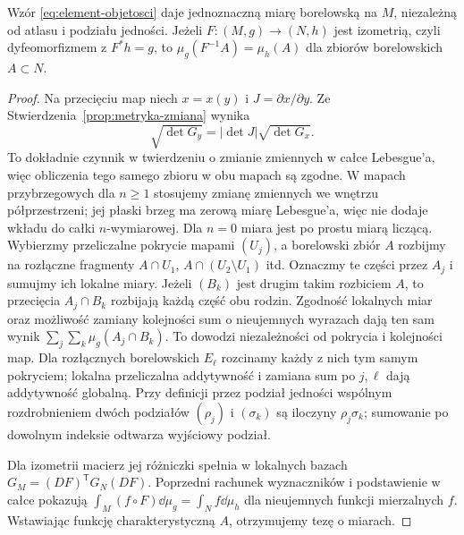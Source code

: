 \begin{twierdzenie}
\label{thm:element-objetosci-globalny}
Wzór \eqref{eq:element-objetosci} daje
jednoznaczną miarę borelowską na $M$, niezależną od atlasu
i podziału jedności. Jeżeli $F:(M,g)\to(N,h)$
jest izometrią, czyli dyfeomorfizmem z $F^*h=g$,
to $\mu_g(F^{-1}A)=\mu_h(A)$ dla zbiorów
borelowskich $A\subset N$.
\end{twierdzenie}
\begin{proof}
Na przecięciu map niech $x=x(y)$ i
$J=\partial x/\partial y$. Ze
Stwierdzenia~\ref{prop:metryka-zmiana} wynika
\[
 \sqrt{\det G_y}
   =|\det J|\sqrt{\det G_x}.
\]
To dokładnie czynnik w twierdzeniu o zmianie
zmiennych w całce Lebesgue'a, więc obliczenia
tego samego zbioru w obu mapach są zgodne.
W mapach przybrzegowych dla $n\geq1$ stosujemy
zmianę zmiennych we wnętrzu półprzestrzeni;
jej płaski brzeg ma zerową miarę Lebesgue'a,
więc nie dodaje wkładu do całki $n$-wymiarowej.
Dla $n=0$ miara jest po prostu miarą liczącą.
Wybierzmy przeliczalne pokrycie mapami
$(U_j)$, a borelowski zbiór $A$ rozbijmy
na rozłączne fragmenty
$A\cap U_1$,
$A\cap(U_2\setminus U_1)$ itd.
Oznaczmy te części przez $A_j$ i sumujmy ich lokalne miary.
Jeżeli $(B_k)$ jest drugim takim rozbiciem $A$,
to przecięcia $A_j\cap B_k$ rozbijają każdą część
obu rodzin. Zgodność lokalnych miar oraz możliwość
zamiany kolejności sum o nieujemnych wyrazach
dają ten sam wynik $\sum_j\sum_k\mu_g(A_j\cap B_k)$.
To dowodzi niezależności od pokrycia i kolejności map.
Dla rozłącznych borelowskich $E_\ell$ rozcinamy
każdy z nich tym samym pokryciem; lokalna przeliczalna
addytywność i zamiana sum po $j,\ell$ dają
addytywność globalną. Przy definicji przez podział jedności
wspólnym rozdrobnieniem dwóch podziałów $(\rho_j)$
i $(\sigma_k)$ są iloczyny $\rho_j\sigma_k$;
sumowanie po dowolnym indeksie odtwarza wyjściowy podział.

Dla izometrii macierz jej różniczki spełnia
w lokalnych bazach $G_M=(DF)^{\mathsf T}G_N(DF)$.
Poprzedni rachunek wyznaczników i podstawienie
w całce pokazują
$\int_M(f\circ F)\dd\mu_g=\int_N f\dd\mu_h$
dla nieujemnych funkcji mierzalnych $f$.
Wstawiając funkcję charakterystyczną $A$,
otrzymujemy tezę o miarach.
\end{proof}

